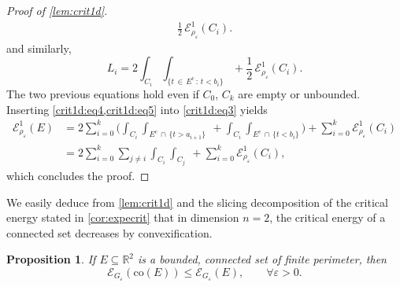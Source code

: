 \documentclass[JEP,XML,SOM,Unicode,published]{cedram}
\newcommand{\sep}{\,:\,}
\numberwithin{equation}{section}
\theoremstyle{plain}
\newtheorem{prp}[thm]{Proposition}
\theoremstyle{definition}
\newcommand{\numberset}[1]{{\mathbb{#1}}}
\newcommand{\R}{\numberset{R}}
\newcommand{\calE}{{\mathcal{E}}}
\let\eps\varepsilon
\newcommand{\co}{{\mathrm{co}}}
\newcommand{\compl}{{\mathrm{c}}}
\newcommand{\subsq}{\subseteq}
\begin{document}
\begin{proof}[Proof of {\cref{lem:crit1d}}]
\begin{equation}
\begin{aligned}
\frac{1}{2}\,\calE^1_{\rho_\eps}(C_i).
\end{aligned}
\end{equation}
and similarly,
\begin{equation}\label{crit1d:eq5}
L_i=2\int_{C_i} \int_{\{t\,\in\, E^\compl\sep t<b_i\}} +
\frac{1}{2}\,\calE^1_{\rho_\eps}(C_i).
\end{equation}
The two previous equations hold even if $C_0$, $C_k$ are empty or unbounded.
Inserting \cref{crit1d:eq4,crit1d:eq5} into \cref{crit1d:eq3} yields
\[
\begin{aligned}
\calE^1_{\rho_\eps}(E)
&=2\sum_{i=0}^k
\biggl( \int_{C_i} \int_{E^\compl\,\cap\,\{t>a_{i+1}\}}~ +\int_{C_i}
\int_{E^\compl\,\cap\,\{t<b_i\}} \biggr) +\sum_{i=0}^k \calE^1_{\rho_\eps}(C_i)\\
&=2\sum_{i=0}^k \sum_{j\neq i} \int_{C_i} \int_{C_j}~ +\sum_{i=0}^k
\calE^1_{\rho_\eps}(C_i),
\end{aligned}
\]
which concludes the proof.
\end{proof}

We easily deduce from \cref{lem:crit1d} and the slicing decomposition of the critical energy stated
in \cref{cor:expecrit} that in dimension $n=2$, the critical energy of a connected set decreases by
convexification.

\begin{prp}\label{prp:decconvex}
If $E\subsq\R^2$ is a bounded, connected set of finite perimeter, then
\[
\calE_{G_\eps}(\co(E))\leq \calE_{G_\eps}(E),\qquad\forall \eps>0.
\]
\end{prp}
\end{document}
